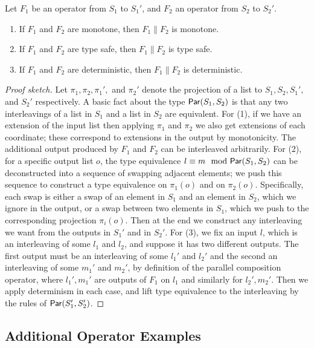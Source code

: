 \begin{proposition}
Let $F_1$ be an operator from $S_1$ to $S_1'$, and $F_2$ an operator from $S_2$ to $S_2'$.
\begin{enumerate}
  \item If $F_1$ and $F_2$ are monotone, then $F_1 \| F_2$ is monotone.
  \item If $F_1$ and $F_2$ are type safe, then $F_1 \| F_2$ is type safe.
  \item If $F_1$ and $F_2$ are deterministic, then $F_1 \| F_2$ is deterministic.
\end{enumerate}
\end{proposition}
\begin{proof}[Proof sketch]
Let $\pi_1, \pi_2, \pi_1',$ and $\pi_2'$ denote the projection of a list to $S_1, S_2, S_1',$ and $S_2'$ respectively.
A basic fact about the type $\mathsf{Par}({S_1}, {S_2})$ is that any two interleavings of a list in $S_1$ and a list in $S_2$ are equivalent.
For (1), if we have an extension of the input list then applying $\pi_1$ and $\pi_2$ we also get extensions of each coordinate; these correspond to extensions in the output by monotonicity. The additional output produced by $F_1$ and $F_2$ can be interleaved arbitrarily.
For (2), for a specific output list $o$, the type equivalence $l \equiv m \mod {\mathsf{Par}({S_1}, {S_2})}$
can be deconstructed into a sequence of swapping adjacent elements; we push this sequence to construct a type equivalence on $\pi_1(o)$ and on $\pi_2(o)$. Specifically, each swap is either a swap of an element in $S_1$ and an element in $S_2$, which we ignore in the output, or a swap between two elements in $S_1$, which we push to the corresponding projection $\pi_i(o)$.
Then at the end we construct any interleaving we want from the outputs in $S_1'$ and in $S_2'$.
For (3), we fix an input $l$, which is an interleaving of some $l_1$ and $l_2$,
and suppose it has two different outputs.
The first output must be an interleaving of some $l_1'$ and $l_2'$ and the second an interleaving of some $m_1'$ and $m_2'$, by definition of the parallel composition operator, where $l_1', m_1'$ are outputs of $F_1$ on $l_1$ and similarly for $l_2', m_2'$. Then we apply determinism in each case, and lift type equivalence to the interleaving by the rules of $\mathsf{Par}({S_1'}, {S_2'})$.
\end{proof}

\subsection{Additional Operator Examples}
\label{sec:outtakes-examples}

